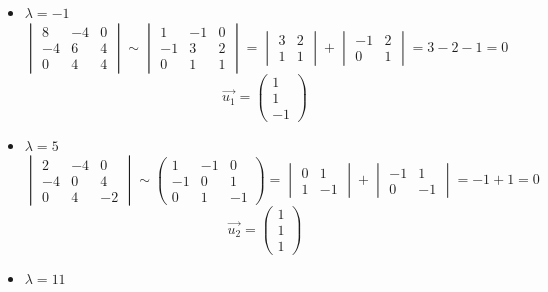 \begin{itemize}
	\item $ \lambda = -1 $
    $$
    \begin{vmatrix}
    	8 & -4 & 0 \\
        -4 & 6 & 4 \\
        0 & 4 & 4
    \end{vmatrix} \sim
    \begin{vmatrix}
    	1 & -1 & 0 \\
        -1 & 3 & 2 \\
        0 & 1 & 1
    \end{vmatrix} =
    \begin{vmatrix}
    	3 & 2 \\
        1 & 1
    \end{vmatrix} +
    \begin{vmatrix}
    	-1 & 2 \\
        0 & 1
    \end{vmatrix} = 3 - 2 - 1 = 0 $$
    $$ \vec{u_1} =
    \begin{pmatrix}
    	1 \\
        1 \\
        -1
    \end{pmatrix} $$
    \item $ \lambda = 5 $
    $$
    \begin{vmatrix}
    	2 & -4 & 0 \\
        -4 & 0 & 4 \\
        0 & 4 & -2
    \end{vmatrix} \sim
    \begin{pmatrix}
    	1 & -1 & 0 \\
        -1 & 0 & 1 \\
        0 & 1 & -1
    \end{pmatrix} =
    \begin{vmatrix}
    	0 & 1 \\
        1 & -1
    \end{vmatrix} +
    \begin{vmatrix}
    	-1 & 1 \\
        0 & -1
    \end{vmatrix} = -1 + 1 = 0 $$
    $$ \vec{u_2} =
    \begin{pmatrix}
    	1 \\
        1 \\
        1
    \end{pmatrix} $$
    \item $ \lambda = 11 $

\end{itemize}
